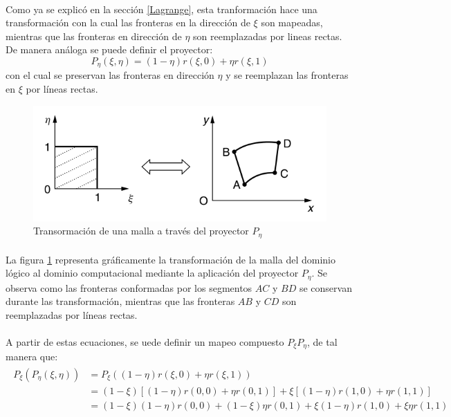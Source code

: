 \documentclass[letterpaper, openright, 12pt]{book}
\begin{document}
			\paragraph*{}
				Como ya se explicó en la sección \ref{Lagrange}, esta tranformación hace una transformación con la cual las fronteras en la dirección de $\xi$ son mapeadas, mientras que las fronteras en dirección de $\eta$ son reemplazadas por lineas rectas. De manera análoga se puede definir el proyector:
				\begin{equation}
					P_{\eta}(\xi, \eta) = (1 - \eta)r(\xi, 0) + \eta r(\xi, 1)
				\end{equation}
				con el cual se preservan las fronteras en dirección $\eta$ y se reemplazan las fronteras en $\xi$ por líneas rectas.
			\begin{figure}[htbp!]
				\centering
				\includegraphics[width=120mm]{./Imagenes/mapeo_eta}
				\caption[Transformación de malla por $P_{\eta}$]{Transormación de una malla a través del proyector $P_{\eta}$ \cite{farrashkhalvat}}
				\label{fig:mapeo_eta}
			\end{figure}
			\paragraph*{}
				La figura \ref{fig:mapeo_eta} representa gráficamente la transformación de la malla del dominio lógico al dominio computacional mediante la aplicación del proyector $P_{\eta}$. Se observa como las fronteras conformadas por los segmentos $AC$ y $BD$ se conservan durante las transformación, mientras que las fronteras $AB$ y $CD$ son reemplazadas por líneas rectas.
			\paragraph*{}
				A partir de estas ecuaciones, se uede definir un mapeo compuesto $P_{\xi}P_{\eta}$, de tal manera que:
				\begin{align}
					\begin{aligned}
						P_{\xi}(P_{\eta}(\xi, \eta)) &= P_{\xi} ((1 - \eta)r(\xi, 0) + \eta r(\xi, 1)) \\
						&= (1 - \xi) \left[ (1 - \eta)r(0, 0) + \eta r(0, 1) \right] + \xi \left[ (1 - \eta)r(1, 0) + \eta r(1,1) \right]\\
						&= (1 - \xi)(1 - \eta)r(0, 0) + (1-\xi)\eta r(0, 1) + \xi(1 - \eta)r(1, 0) + \xi\eta r(1, 1)
					\end{aligned}
				\end{align}
\end{document}

